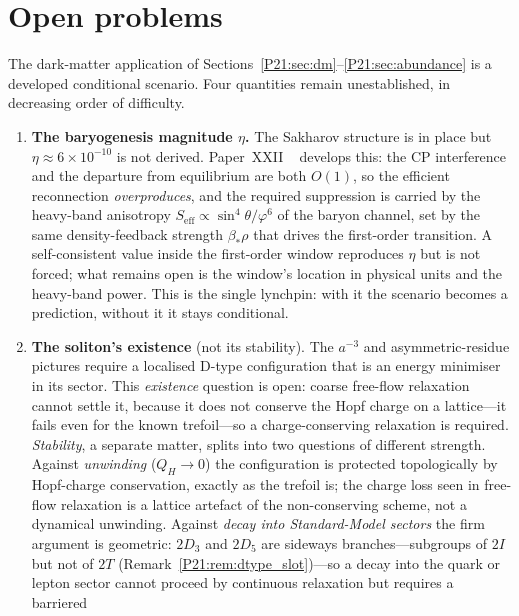 \documentclass[11pt,a4paper]{article}
\theoremstyle{definition}\newtheorem{definition}[theorem]{Definition}
\theoremstyle{remark}
\newcommand{\vp}{\varphi}
\newcommand{\twoI}{2I}
\newcommand{\twoT}{2T}
\newcommand{\twoD}{2D}
\newcommand{\QH}{Q_H}
\begin{document}
\section{Open problems}
\label{P21:sec:open}
The dark-matter application of Sections~\ref{P21:sec:dm}--\ref{P21:sec:abundance}
is a developed conditional scenario. Four quantities remain unestablished,
in decreasing order of difficulty.
\begin{enumerate}[noitemsep,label=(\roman*)]
\item \textbf{The baryogenesis magnitude $\eta$.} The Sakharov structure
is in place but $\eta\approx6\times10^{-10}$ is not derived. Paper~XXII%
~\cite{Paper22} develops this: the CP interference and the departure from
equilibrium are both $O(1)$, so the efficient reconnection
\emph{overproduces}, and the required suppression is carried by the
heavy-band anisotropy $S_{\mathrm{eff}}\propto\sin^4\theta/\vp^6$ of the
baryon channel, set by the same density-feedback strength $\beta_*\rho$
that drives the first-order transition. A self-consistent value inside the
first-order window reproduces $\eta$ but is not forced; what remains open
is the window's location in physical units and the heavy-band power. This
is the single lynchpin: with it the scenario becomes a prediction, without
it it stays conditional.
\item \textbf{The soliton's existence} (not its stability). The $a^{-3}$
and asymmetric-residue pictures require a localised D-type configuration
that is an energy minimiser in its sector. This \emph{existence} question
is open: coarse free-flow relaxation cannot settle it, because it does
not conserve the Hopf charge on a lattice---it fails even for the known
trefoil---so a charge-conserving relaxation is required. \emph{Stability},
a separate matter, splits into two questions of different strength. Against
\emph{unwinding} ($\QH\to0$) the configuration is protected topologically
by Hopf-charge conservation, exactly as the trefoil is; the charge loss
seen in free-flow relaxation is a lattice artefact of the non-conserving
scheme, not a dynamical unwinding. Against \emph{decay into
Standard-Model sectors} the firm argument is geometric: $\twoD_3$ and
$\twoD_5$ are sideways branches---subgroups of $\twoI$ but not of $\twoT$
(Remark~\ref{P21:rem:dtype_slot})---so a decay into the quark or lepton
sector cannot proceed by continuous relaxation but requires a barriered

\end{enumerate}
\end{document}
